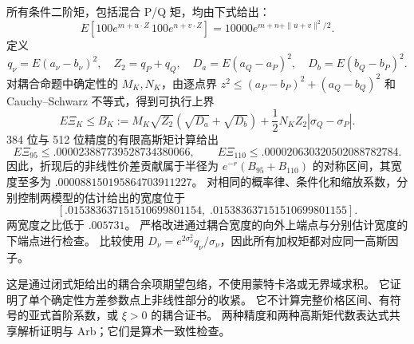 所有条件二阶矩，包括混合 P/Q 矩，均由下式给出：
\[
E\!\left[100e^{m+u\cdot Z}\,100e^{n+v\cdot Z}\right]
=10000e^{m+n+\|u+v\|^2/2}.
\]
定义
\[
q_\nu=E(a_\nu-b_\nu)^2,\quad Z_2=q_P+q_Q,\quad
D_a=E(a_Q-a_P)^2,\quad D_b=E(b_Q-b_P)^2.
\]
对耦合命题中确定性的 \(M_K,N_K\)，由逐点界 \(z^2\le(a_P-b_P)^2+(a_Q-b_Q)^2\) 和 Cauchy--Schwarz 不等式，得到可执行上界
\[
E\Xi_K\le B_K:=
M_K\sqrt{Z_2}(\sqrt{D_a}+\sqrt{D_b})
+\frac12N_KZ_2|\sigma_Q-\sigma_P|.
\]
384 位与 512 位精度的有限高斯矩计算给出
\[
E\Xi_{95}\le .000023887739528734380066,\qquad
E\Xi_{110}\le .000020630320502088782784.
\]
因此，折现后的非线性价差贡献属于半径为 \(e^{-r}(B_{95}+B_{110})\) 的对称区间，其宽度至多为 \(.000088150195864703911227\)。
对相同的概率律、条件化和缩放系数，分别控制两模型的估计给出的宽度位于
\[
[.015383637151510699801154,\;.015383637151510699801155].
\]
两宽度之比低于 \(.005731\)。
严格改进通过耦合宽度的向外上端点与分别估计宽度的下端点进行检查。
比较使用
\(D_\nu=e^{2\sigma_\nu^2}q_\nu/\sigma_\nu\)，因此所有加权矩都对应同一高斯因子。

这是通过闭式矩给出的耦合余项期望包络，不使用蒙特卡洛或无界域求积。
它证明了单个确定性方差参数点上非线性部分的收紧。
它不计算完整价格区间、有符号的亚式首阶系数，或 \(\xi>0\) 的耦合证书。
两种精度和两种高斯矩代数表达式共享解析证明与 Arb；它们是算术一致性检查。

